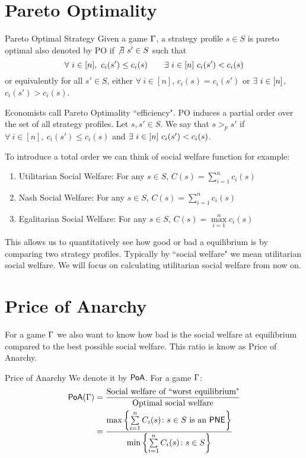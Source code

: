 \section{Pareto Optimality}
\begin{definition}{Pareto Optimal Strategy}{}
Given a game $\Gamma$, a strategy profile $s\in S$	is pareto optimal also denoted by \textsf{PO} if $\not\exists\ s'\in S$ such that $$\forall\ i\in[n],\ c_i(s')\leq c_i(s)\qquad\exs\ i\in[n]\ c_i(s')<c_i(s)$$or equivalently for all $s'\in S$, either $\forall\ i\in[n]$, $c_i(s)=c_i(s')$ or $\exists\ i\in[n]$, $c_i(s')>c_i(s)$.
\end{definition}

Economists call Pareto Optimality ``efficiency". \textsf{PO} induces a partial order over the set of all strategy profiles. Let $s,s'\in S$. We say that $s>_ps'$ if $\forall\ i\in[n],\ c_i(s')\leq c_i(s)$ and $\exs\ i\in[n]\ c_i(s')<c_i(s)$.

To introduce a total order we can think of  social welfare function for example:
\begin{enumerate}[label=(\arabic*)]
	\item Utilitarian Social Welfare: For any $s\in S$, $C(s)=\sum\limits_{i=1}^n c_i(s)$
	\item Nash Social Welfare: For any $s\in S$, $C(s)=\sum\limits_{i=1}^n c_i(s)$
	\item Egalitarian Social Welfare: For any $s\in S$, $C(s)=\max\limits_{i=1}^n c_i(s)$
\end{enumerate}This allows us to quantitatively see how good or bad a equilibrium is by comparing two strategy profiles. Typically by ``social welfare" we mean utilitarian social welfare. We will focus on calculating utilitarian social welfare from now on.
\section{Price of Anarchy}

For a game $\Gamma$ we also want to know how bad is the social welfare at equilibrium compared to the best possible social welfare. This ratio is know as Price of Anarchy.
\begin{definition}{Price of Anarchy}{}
	We denote it by $\operatorname{\mathsf{PoA}}$. For a game $\Gamma$:\begin{align*}
		\operatorname{\mathsf{PoA}}(\Gamma)& =\frac{\text{Social welfare of ``worst equilibrium"}}{\text{Optimal social welfare}}\\
		&= \frac{\max\left\{\sum\limits_{i=1}^n C_i(s)\colon s\in S\text{ is an $\operatorname{\mathsf{PNE}}$}\right\}}{\min\left\{\sum\limits_{i=1}^n C_i(s)\colon s\in S\right\}}
	\end{align*}
\end{definition}
